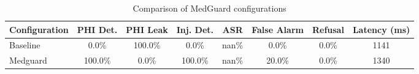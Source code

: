 \begin{table}[h]
\centering
\begin{tabular}{lccccccc}
\toprule
Configuration & PHI Det. & PHI Leak & Inj. Det. & ASR & False Alarm & Refusal & Latency (ms) \\
\midrule
Baseline & 0.0\% & 100.0\% & 0.0\% & nan\% & 0.0\% & 0.0\% & 1141 \\
Medguard & 100.0\% & 0.0\% & 100.0\% & nan\% & 20.0\% & 0.0\% & 1340 \\
\bottomrule
\end{tabular}
\caption{Comparison of MedGuard configurations}
\label{tab:config-comparison}
\end{table}